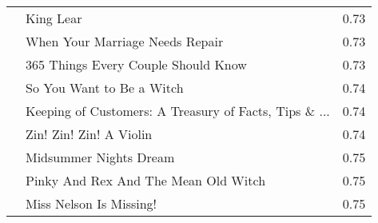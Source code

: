 \begin{table}[H]
\begin{tabular}{ |l|l|l| }
		 &  King Lear  &  0.73  \\
		 &  When Your Marriage Needs Repair &  0.73  \\
		 &  365 Things Every Couple Should Know  &  0.73  \\
		 &  So You Want to Be a Witch  &  0.74  \\
		 &  Keeping of Customers: A Treasury of Facts, Tips \& ...  &  0.74  \\
		 &  Zin! Zin! Zin! A Violin  &  0.74  \\
		 &  Midsummer Nights Dream  &  0.75  \\
		 &  Pinky And Rex And The Mean Old Witch  &  0.75  \\
		 &  Miss Nelson Is Missing!  &  0.75  \\
		\hline
	\end{tabular}
\end{table}



